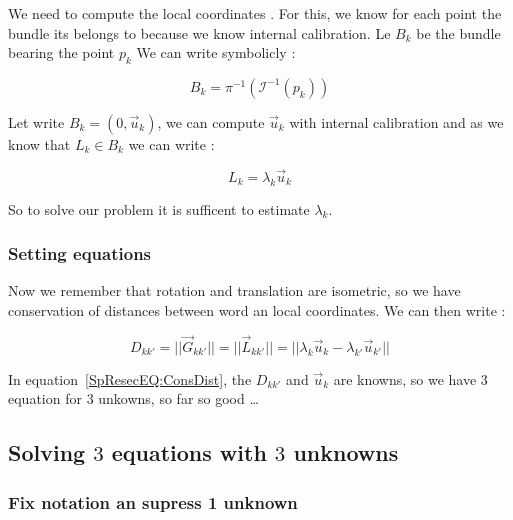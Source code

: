 We need to compute the local coordinates . For this, we know for each point the bundle its belongs
to because we know internal calibration. Le $B_k$ be the bundle bearing the point $p_k$ We can write symbolicly :


\begin{equation}
	B_k =  \pi^{-1} (\mathcal I ^{-1} (p_k)) \label{SpResecEQ:DefBundle}
\end{equation}



Let write $B_k = (0,\Vec{u}_k)$,  we can compute $\Vec{u}_k$ with internal calibration and
as we know that $L_k \in B_k$ we can write  :


\begin{equation}
	L_k = \lambda_k \Vec{u}_k \label{SpResecEQ:DefLambda}
\end{equation}

So to solve our problem it is sufficent to estimate $\lambda_k$.

\subsubsection{Setting equations}

Now we remember that rotation and translation are isometric, so we have conservation of
distances between  word an local coordinates. We can then write :

\begin{equation}
  D_{kk'}=||\Vec{G}_{kk'}||   = || \Vec{L}_{kk'} || = || \lambda_k \Vec{u}_k -  \lambda_{k'} \Vec{u}_{k'}|| \label{SpResecEQ:ConsDist}
\end{equation}


In equation~\ref{SpResecEQ:ConsDist}, the $D_{kk'}$ and  $\Vec{u}_k$ are knowns, so we have $3$ equation  for
$3$ unkowns, so far so good \dots 




\subsection{Solving $3$  equations with $3$ unknowns}

\subsubsection{Fix notation an supress 1 unknown}

